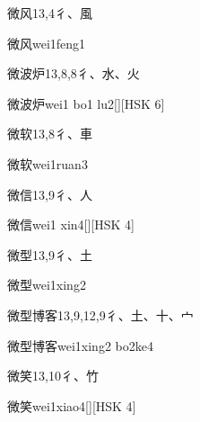 \begin{Entry}{微风}{13,4}{⼻、⾵}
  \begin{Phonetics}{微风}{wei1feng1}
  \end{Phonetics}
\end{Entry}

\begin{Entry}{微波炉}{13,8,8}{⼻、⽔、⽕}
  \begin{Phonetics}{微波炉}{wei1 bo1 lu2}[][HSK 6]
  \end{Phonetics}
\end{Entry}

\begin{Entry}{微软}{13,8}{⼻、⾞}
  \begin{Phonetics}{微软}{wei1ruan3}
  \end{Phonetics}
\end{Entry}

\begin{Entry}{微信}{13,9}{⼻、⼈}
  \begin{Phonetics}{微信}{wei1 xin4}[][HSK 4]
  \end{Phonetics}
\end{Entry}

\begin{Entry}{微型}{13,9}{⼻、⼟}
  \begin{Phonetics}{微型}{wei1xing2}
  \end{Phonetics}
\end{Entry}

\begin{Entry}{微型博客}{13,9,12,9}{⼻、⼟、⼗、⼧}
  \begin{Phonetics}{微型博客}{wei1xing2 bo2ke4}
  \end{Phonetics}
\end{Entry}

\begin{Entry}{微笑}{13,10}{⼻、⽵}
  \begin{Phonetics}{微笑}{wei1xiao4}[][HSK 4]
  \end{Phonetics}
\end{Entry}


